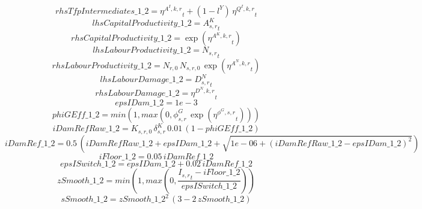 \begin{dmath*}
rhsTfpIntermediates\_1\_2 = {{\eta^{A^{I},k,r}}}_{t}+\left(1-{{l^{Y}}}\right)\, {{\eta^{Q^{I},k,r}}}_{t}
\end{dmath*}
\begin{dmath*}
lhsCapitalProductivity\_1\_2 = {{A^{K}_{s,r}}}_{t}
\end{dmath*}
\begin{dmath*}
rhsCapitalProductivity\_1\_2 = \exp\left({{\eta^{A^{K},k,r}}}_{t}\right)
\end{dmath*}
\begin{dmath*}
lhsLabourProductivity\_1\_2 = {{N_{s,r}}}_{t}
\end{dmath*}
\begin{dmath*}
rhsLabourProductivity\_1\_2 = {{N_{r,0}}}\, {{N_{s,r,0}}}\, \exp\left({{\eta^{A^{N},k,r}}}_{t}\right)
\end{dmath*}
\begin{dmath*}
lhsLabourDamage\_1\_2 = {{D^N_{s,r}}}_{t}
\end{dmath*}
\begin{dmath*}
rhsLabourDamage\_1\_2 = {{\eta^{D^{N},k,r}}}_{t}
\end{dmath*}
\begin{dmath*}
epsIDam\_1\_2 = 1e-3
\end{dmath*}
\begin{dmath*}
phiGEff\_1\_2 = min(1,max(0,{{\phi^{G}_{s,r}}}\, \exp\left({{\eta^{\phi^{G},s,r}}}_{t}\right)))
\end{dmath*}
\begin{dmath*}
iDamRefRaw\_1\_2 = {{K_{s,r,0}}}\, {{\delta^{K}_{s,r}}}\, 0.01\, \left(1-{phiGEff\_1\_2}\right)
\end{dmath*}
\begin{dmath*}
iDamRef\_1\_2 = 0.5\, \left({iDamRefRaw\_1\_2}+{epsIDam\_1\_2}+\sqrt{1e-06+\left({iDamRefRaw\_1\_2}-{epsIDam\_1\_2}\right)^{2}}\right)
\end{dmath*}
\begin{dmath*}
iFloor\_1\_2 = 0.05\, {iDamRef\_1\_2}
\end{dmath*}
\begin{dmath*}
epsISwitch\_1\_2 = {epsIDam\_1\_2}+0.02\, {iDamRef\_1\_2}
\end{dmath*}
\begin{dmath*}
zSmooth\_1\_2 = min(1,max(0,\frac{{{I_{s,r}}}_{t}-{iFloor\_1\_2}}{{epsISwitch\_1\_2}}))
\end{dmath*}
\begin{dmath*}
sSmooth\_1\_2 = {zSmooth\_1\_2}^{2}\, \left(3-2\, {zSmooth\_1\_2}\right)
\end{dmath*}
